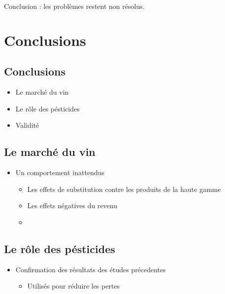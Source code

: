 \documentclass[11pt,]{article}
\providecommand{\tightlist}{%
  \setlength{\itemsep}{0pt}\setlength{\parskip}{0pt}}
\begin{document}
Conclusion : les problèmes restent non résolus.

\FloatBarrier

\hypertarget{conclusions}{%
\section{Conclusions}\label{conclusions}}

\FloatBarrier

\FloatBarrier

\hypertarget{conclusions-1}{%
\subsection{Conclusions}\label{conclusions-1}}

\begin{itemize}
\tightlist
\item
  Le marché du vin
\item
  Le rôle des pésticides\\
\item
  Validité
\end{itemize}

\FloatBarrier

\hypertarget{le-marche-du-vin}{%
\subsection{Le marché du vin}\label{le-marche-du-vin}}

\begin{itemize}
\tightlist
\item
  Un comportement inattendus

  \begin{itemize}
  \item
    Les effets de substitution contre les produits de la haute gamme
  \item
    Les effets négatives du revenu
  \item
  \end{itemize}
\end{itemize}

\FloatBarrier

\hypertarget{le-role-des-pesticides}{%
\subsection{Le rôle des pésticides}\label{le-role-des-pesticides}}

\begin{itemize}
\tightlist
\item
  Confirmation des résultats des études précedentes

  \begin{itemize}
  \tightlist
  \item
    Utilisés pour réduire les pertes
  \end{itemize}
\end{itemize}
\end{document}
